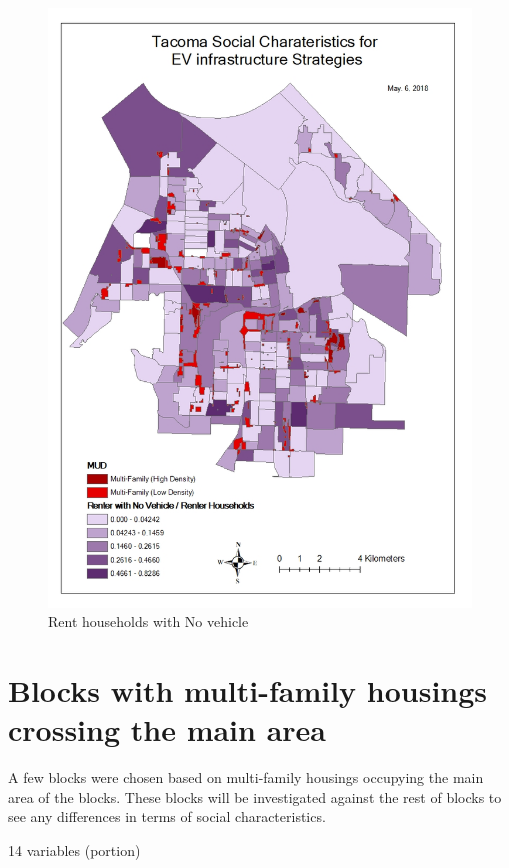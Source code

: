 \documentclass[]{article}
\begin{document}
\begin{figure}
\centering
\includegraphics{./figs/novehicle.jpg}
\caption{Rent households with No vehicle}
\end{figure}

\section{Blocks with multi-family housings crossing the main
area}\label{blocks-with-multi-family-housings-crossing-the-main-area}

A few blocks were chosen based on multi-family housings occupying the
main area of the blocks. These blocks will be investigated against the
rest of blocks to see any differences in terms of social
characteristics.

14 variables (portion)
\end{document}
